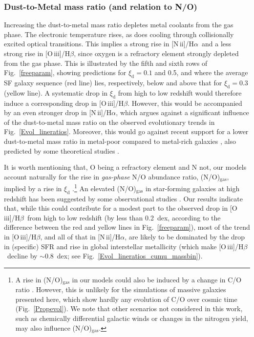 \documentclass[fleqn,usenatbib]{mnras}
\newcommand{\oiiihb}{\hbox{[O\,{\sc iii}]/H$\beta$}}
\newcommand{\niiha}{\hbox{[N\,{\sc ii}]/H$\alpha$}}
\begin{document}
\subsubsection{Dust-to-Metal mass ratio (and relation to N/O)}\label{noratio}

Increasing the dust-to-metal mass ratio depletes metal coolants from  
the gas phase. The electronic temperature rises, as does cooling
through collisionally excited optical transitions. This implies a
strong rise in \niiha\ and a less strong rise in \oiiihb,  since
oxygen is a refractory element strongly depleted from the gas phase.
This is illustrated by the fifth and sixth rows of
Fig.~\ref{freeparam}, showing predictions for $\xi_\mathrm{d}=0.1$ and
0.5,  and where the average SF galaxy sequence (red line) lies,
respectively, below  and above that for $\xi_\mathrm{d}=0.3$ (yellow
line).  A  systematic drop in $\xi_\mathrm{d}$ from high to low
redshift would therefore induce a corresponding drop in
\oiiihb. However, this would be accompanied by an even stronger drop
in  \niiha, which argues against a significant influence of the
dust-to-metal mass ratio on the observed evolutionary trends in
Fig.~\ref{Evol_lineratios}. Moreover, this would go against recent support
for a lower dust-to-metal mass ratio in metal-poor compared to metal-rich
galaxies \citep{RemyRuyer14}, also predicted by some theoretical studies
\citep{Inoue03, Asano13}. 

It is worth mentioning that, O being a refractory element and N not, 
our models account naturally for the rise in {\em gas-phase} N/O 
abundance ratio, (N/O)$_\mathrm{gas}$, implied by a rise in
$\xi_\mathrm{d}$  \citep[see fig.~1 of][]{Gutkin16}.\footnote{ 
A rise in (N/O)$_\mathrm{gas}$ in our models
could also  be induced by a change in C/O ratio \citep[fig.~1 of][]{Gutkin16}.
However, this is unlikely for the simulations of massive galaxies 
presented here, which show hardly any evolution of C/O over cosmic
time (Fig.~\ref{Propevol}). We note that other scenarios 
not considered in this work, such as chemically differential
  galactic winds \citep{Vincenzo16} or changes in the nitrogen yield,
  may also influence (N/O)$_\mathrm{gas}$.}
An elevated (N/O)$_\mathrm{gas}$ in star-forming
galaxies at high redshift has been suggested by some observational
studies \citep[e.g.][see Section~\ref{obstudies}
below]{Shapley15}. Our results indicate that, while this could
contribute for a modest part to the observed drop in \oiiihb\ from
high to low redshift (by less than 0.2~dex, according to the
difference between the red and yellow lines in Fig.~\ref{freeparam}),
most of the trend in \oiiihb, and all of that in \niiha, are likely to
be dominated by the drop in (specific) SFR and rise in  global
interstellar metallicity (which make \oiiihb\ decline by
$\sim$0.8~dex; see Fig.~\ref{Evol_lineratios_cumu_massbin}).  
\end{document}
